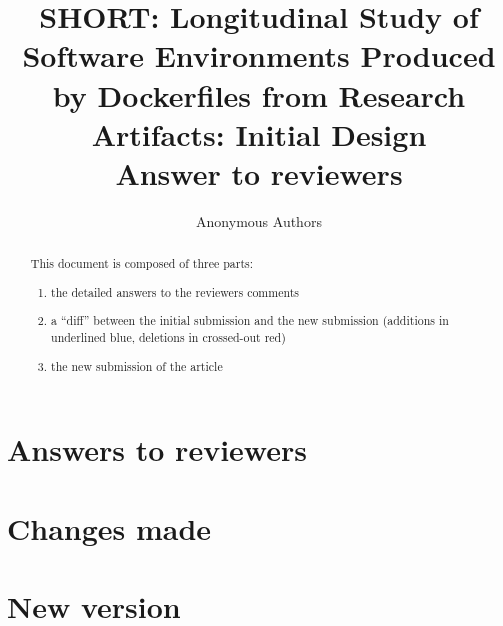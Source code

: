 \documentclass{article}
\title{%
  SHORT: Longitudinal Study of Software Environments Produced by Dockerfiles from Research Artifacts: Initial Design
	\\
	{\Large%
	Answer to reviewers
	}
}
\author{Anonymous Authors}
\date{}
\begin{document}
\maketitle



\begin{abstract}
This document is composed of three parts:

\begin{enumerate}
\item the detailed answers to the reviewers comments
\item a ``diff'' between the initial submission and the new submission (additions in underlined blue, deletions in crossed-out red)
\item the new submission of the article
\end{enumerate}
\end{abstract}

\tableofcontents

\section{Answers to reviewers}

\section{Changes made}

\section{New version}

\end{document}
